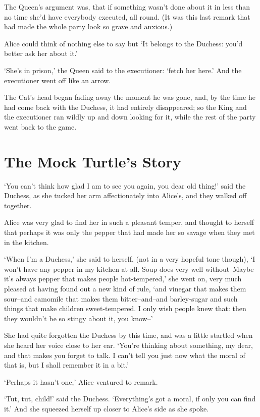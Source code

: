 \documentclass[statementpaper,twoside,openany]{memoir}
\begin{document}
The Queen's argument was, that if something wasn't done about it in less than no time she'd have everybody executed, all round. (It was this last remark that had made the whole party look so grave and anxious.)

Alice could think of nothing else to say but `It belongs to the Duchess: you'd better ask her about it.'

`She's in prison,' the Queen said to the executioner: `fetch her here.' And the executioner went off like an arrow.

The Cat's head began fading away the moment he was gone, and, by the time he had come back with the Duchess, it had entirely disappeared; so the King and the executioner ran wildly up and down looking for it, while the rest of the party went back to the game.

\chapter{The Mock Turtle's Story}

`You can't think how glad I am to see you again, you dear old thing!' said the Duchess, as she tucked her arm affectionately into Alice's, and they walked off together.

Alice was very glad to find her in such a pleasant temper, and thought to herself that perhaps it was only the pepper that had made her so savage when they met in the kitchen.

`When I'm a Duchess,' she said to herself, (not in a very hopeful tone though), `I won't have any pepper in my kitchen at all. Soup does very well without--Maybe it's always pepper that makes people hot-tempered,' she went on, very much pleased at having found out a new kind of rule, `and vinegar that makes them sour--and camomile that makes them bitter--and--and barley-sugar and such things that make children sweet-tempered. I only wish people knew that: then they wouldn't be so stingy about it, you know--'

She had quite forgotten the Duchess by this time, and was a little startled when she heard her voice close to her ear. `You're thinking about something, my dear, and that makes you forget to talk. I can't tell you just now what the moral of that is, but I shall remember it in a bit.'

`Perhaps it hasn't one,' Alice ventured to remark.

`Tut, tut, child!' said the Duchess. `Everything's got a moral, if only you can find it.' And she squeezed herself up closer to Alice's side as she spoke.
\end{document}
